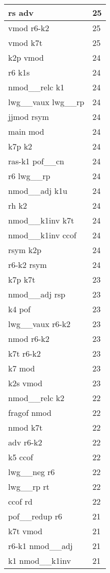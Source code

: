 \documentclass[a4 paper]{article}
\begin{document}
\begin{longtable}{p{}p{}}
rs adv  & 25 \\ \midrule
vmod r6-k2  & 25 \\ \midrule
vmod k7t  & 25 \\ \midrule
k2p vmod  & 24 \\ \midrule
r6 k1s  & 24 \\ \midrule
nmod\_\_relc k1  & 24 \\ \midrule
lwg\_\_vaux lwg\_\_rp  & 24 \\ \midrule
jjmod rsym  & 24 \\ \midrule
main mod  & 24 \\ \midrule
k7p k2  & 24 \\ \midrule
ras-k1 pof\_\_cn  & 24 \\ \midrule
r6 lwg\_\_rp  & 24 \\ \midrule
nmod\_\_adj k1u  & 24 \\ \midrule
rh k2  & 24 \\ \midrule
nmod\_\_k1inv k7t  & 24 \\ \midrule
nmod\_\_k1inv ccof  & 24 \\ \midrule
rsym k2p  & 24 \\ \midrule
r6-k2 rsym  & 24 \\ \midrule
k7p k7t  & 23 \\ \midrule
nmod\_\_adj rsp  & 23 \\ \midrule
k4 pof  & 23 \\ \midrule
lwg\_\_vaux r6-k2  & 23 \\ \midrule
nmod r6-k2  & 23 \\ \midrule
k7t r6-k2  & 23 \\ \midrule
k7 mod  & 23 \\ \midrule
k2s vmod  & 23 \\ \midrule
nmod\_\_relc k2  & 22 \\ \midrule
fragof nmod  & 22 \\ \midrule
nmod k7t  & 22 \\ \midrule
adv r6-k2  & 22 \\ \midrule
k5 ccof  & 22 \\ \midrule
lwg\_\_neg r6  & 22 \\ \midrule
lwg\_\_rp rt  & 22 \\ \midrule
ccof rd  & 22 \\ \midrule
pof\_\_redup r6  & 21 \\ \midrule
k7t vmod  & 21 \\ \midrule
r6-k1 nmod\_\_adj  & 21 \\ \midrule
k1 nmod\_\_k1inv  & 21 \\ \midrule

\end{longtable}
\end{document}
